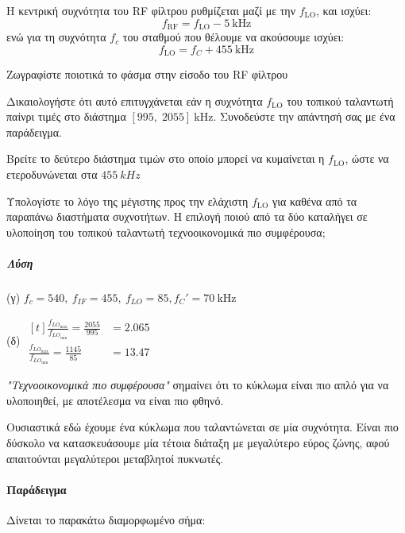 \documentclass[11pt,a4paper,notitlepage,fleqn]{article}
\begin{document}
Η κεντρική συχνότητα του RF φίλτρου ρυθμίζεται
μαζί με την \( f_{\mathrm{LO}} \), και ισχύει:
\[
f_{\mathrm{RF}} = f_{\mathrm{LO}} - \SI{5}{\kilo\hertz}
\]
ενώ για τη συχνότητα \( f_c \) του σταθμού που θέλουμε
να ακούσουμε ισχύει:
\[
f_{\mathrm{LO}} = f_C + \SI{455}{\kilo\hertz}
\]
\begin{enumgreekparen}
	\item Ζωγραφίστε ποιοτικά το φάσμα στην είσοδο
	του RF φίλτρου
	\item Δικαιολογήστε ότι αυτό επιτυγχάνεται εάν η συχνότητα
	\( f_{\mathrm{LO}} \) του τοπικού ταλαντωτή παίνρι τιμές στο διάστημα \( [995,\;2055]\ \si{\kilo\hertz} \). Συνοδεύστε την απάντησή σας με ένα παράδειγμα.
	\item Βρείτε το δεύτερο διάστημα τιμών στο οποίο
	μπορεί να κυμαίνεται η \( f_{\mathrm{LO}} \), ώστε
	να ετεροδυνώνεται στα \( \SI{455}{kHz} \)
	\item Υπολογίστε το λόγο της μέγιστης προς την ελάχιστη \( f_{\mathrm{LO}} \)
	για καθένα από τα παραπάνω διαστήματα συχνοτήτων.
	Η επιλογή ποιού από τα δύο καταλήγει σε υλοποίηση του τοπικού ταλαντωτή
	τεχνοοικονομικά πιο συμφέρουσα;
\end{enumgreekparen}

\subparagraph{Λύση}
\begin{enumgreekparen}
	\item {}
	\item[(γ)] \(  f_c=540,\ f_{IF}=455,\ f_{LO} = 85, f_C' = \SI{70}{\kilo\hertz}  \)
	\item[(δ)] \(
	\begin{aligned}[t]
		\frac{f_{LO_{\max}}}{f_{LO_{\min}}}
		= \frac{2055}{995} &= 2.065 \\
		\frac{f_{LO_{\max}}}{f_{LO_{\min}}}
		= \frac{1145}{85} &= 13.47
	\end{aligned} \)
	
	\textit{"Τεχνοοικονομικά πιο συμφέρουσα"}
	σημαίνει ότι το κύκλωμα είναι πιο απλό για να
	υλοποιηθεί, με αποτέλεσμα να είναι πιο φθηνό.
	
	Ουσιαστικά εδώ έχουμε ένα κύκλωμα που ταλαντώνεται σε μία συχνότητα. Είναι
	πιο δύσκολο να κατασκευάσουμε μία τέτοια διάταξη με μεγαλύτερο εύρος ζώνης,
	αφού απαιτούνται μεγαλύτεροι μεταβλητοί πυκνωτές.
\end{enumgreekparen}

\paragraph{Παράδειγμα}
Δίνεται το παρακάτω διαμορφωμένο σήμα:
\end{document}
